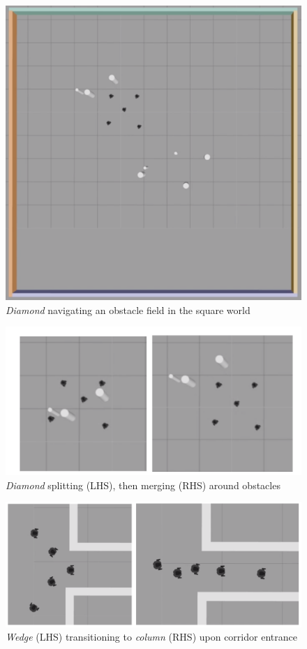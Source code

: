 \documentclass[letterpaper, 10 pt, conference]{ieeeconf}  %
\begin{document}
\begin{figure}[tb]
\centering
\includegraphics[width=0.7\linewidth]{images/square.png}
\caption{\textit{Diamond} navigating an obstacle field in the square world}
\label{fig:square}
\end{figure}

\begin{figure}[tb]
\centering
\includegraphics[width=0.8\linewidth]{images/split_merge.png}
\caption{\textit{Diamond} splitting (LHS), then merging (RHS) around obstacles}
\label{fig:split_merge}
\end{figure}

\begin{figure}[tb]
\centering
\includegraphics[width=0.9\linewidth]{images/switch_formation.png}
\caption{\textit{Wedge} (LHS) transitioning to \textit{column} (RHS) upon corridor entrance}
\label{fig:switch_formation}
\end{figure}
\end{document}
